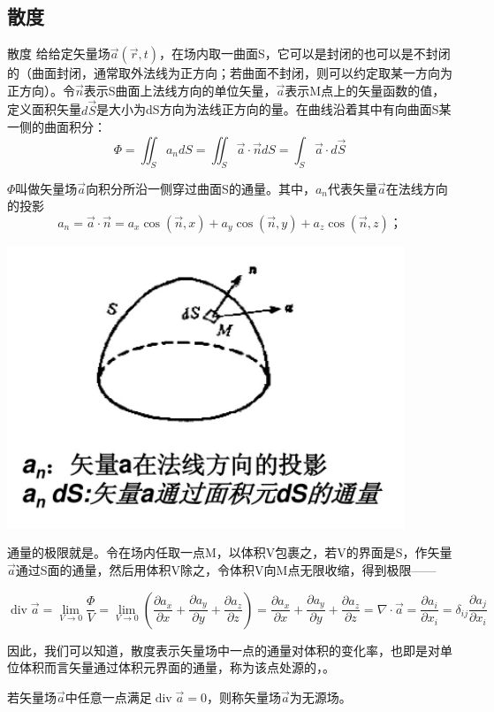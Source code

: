 \documentclass{ctexart}
\begin{document}
\subsection{散度}
\begin{定义}{散度}
   给给定矢量场$\vec{a}(\vec{r},t)$，在场内取一曲面S，它可以是封闭的也可以是不封闭的（曲面封闭，通常取外法线为正方向；若曲面不封闭，则可以约定取某一方向为正方向）。令$\vec{n}$表示S曲面上法线方向的单位矢量，$\vec{a}$表示M点上的矢量函数的值，定义面积矢量$d\vec{S}$是大小为dS方向为法线正方向的量。在曲线沿着其中有向曲面S某一侧的曲面积分：
   $$
  \Phi=\iint_{S} a_{n} d S=\iint_{S} \vec{a} \cdot \vec{n} d S=\int_{S} \vec{a} \cdot d \vec{S}
$$
\par
$\Phi$叫做矢量场$\vec{a}$向积分所沿一侧穿过曲面S的通量。其中，$a_{n}$代表矢量$\vec{a}$在法线方向的投影
$$
a_{n}=\vec{a} \cdot \vec{n}={a}_{x} \cos(\vec{n},x)+{a}_{y} \cos(\vec{n},y)+{a}_{z} \cos(\vec{n},z)；
$$
\par 
\begin{center}
\includegraphics{divergence.png}
\end{center}

\par
  通量的极限就是。令在场内任取一点M，以体积V包裹之，若V的界面是S，作矢量$\vec{a}$通过S面的通量，然后用体积V除之，令体积V向M点无限收缩，得到极限——
 
  $$
  \operatorname{div} \vec{a}=\lim _{V \rightarrow 0} \frac{\Phi}{V}=\lim _{V \rightarrow 0}\left(\frac{\partial a_{x}}{\partial x}+\frac{\partial a_{y}}{\partial y}+\frac{\partial a_{z}}{\partial z}\right)=\frac{\partial a_{x}}{\partial x}+\frac{\partial a_{y}}{\partial y}+\frac{\partial a_{z}}{\partial z}=\nabla \cdot \vec{a}=\frac{\partial a_{i}}{\partial x_{i}}=\delta_{i j} \frac{\partial a_{j}}{\partial x_{i}}
  $$
\end{定义}
因此，我们可以知道，散度表示矢量场中一点的通量对体积的变化率，也即是对单位体积而言矢量通过体积元界面的通量，称为该点处源的，。
\par
若矢量场$\vec{a}$中任意一点满足$\operatorname{div} \vec{a}=0$，则称矢量场$\vec{a}$为无源场。
\end{document}
